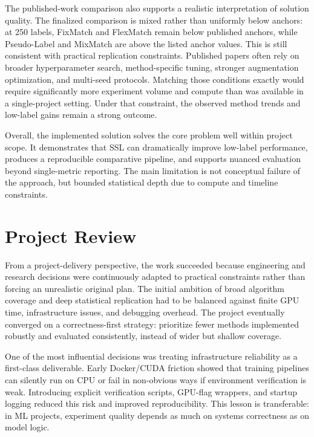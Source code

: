 The published-work comparison also supports a realistic interpretation of solution quality. The finalized comparison is mixed rather than uniformly below anchors: at 250 labels, FixMatch and FlexMatch remain below published anchors, while Pseudo-Label and MixMatch are above the listed anchor values. This is still consistent with practical replication constraints. Published papers often rely on broader hyperparameter search, method-specific tuning, stronger augmentation optimization, and multi-seed protocols. Matching those conditions exactly would require significantly more experiment volume and compute than was available in a single-project setting. Under that constraint, the observed method trends and low-label gains remain a strong outcome.

Overall, the implemented solution solves the core problem well within project scope. It demonstrates that SSL can dramatically improve low-label performance, produces a reproducible comparative pipeline, and supports nuanced evaluation beyond single-metric reporting. The main limitation is not conceptual failure of the approach, but bounded statistical depth due to compute and timeline constraints.

\section{Project Review}

From a project-delivery perspective, the work succeeded because engineering and research decisions were continuously adapted to practical constraints rather than forcing an unrealistic original plan. The initial ambition of broad algorithm coverage and deep statistical replication had to be balanced against finite GPU time, infrastructure issues, and debugging overhead. The project eventually converged on a correctness-first strategy: prioritize fewer methods implemented robustly and evaluated consistently, instead of wider but shallow coverage.

One of the most influential decisions was treating infrastructure reliability as a first-class deliverable. Early Docker/CUDA friction showed that training pipelines can silently run on CPU or fail in non-obvious ways if environment verification is weak. Introducing explicit verification scripts, GPU-flag wrappers, and startup logging reduced this risk and improved reproducibility. This lesson is transferable: in ML projects, experiment quality depends as much on systems correctness as on model logic.

